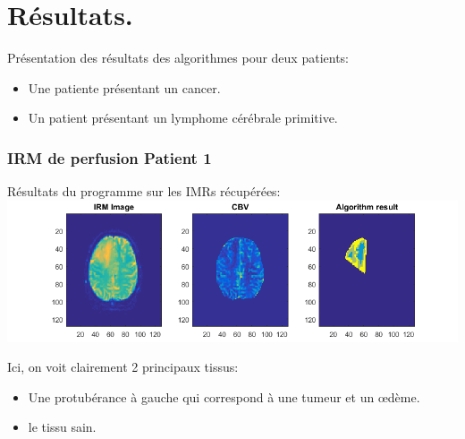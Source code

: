 \documentclass{beamer}
\begin{document}


\section{Résultats.}

\begin{frame}

Présentation des résultats des algorithmes pour deux patients:

\begin{itemize}
\item Une patiente présentant un cancer.
\item Un patient présentant un lymphome cérébrale primitive.
\end{itemize}



\end{frame}

\begin{frame}
\frametitle{IRM de perfusion Patient 1}


\end{frame}

\begin{frame}

Résultats du programme sur les IMRs récupérées:
\includegraphics[scale=0.40]{Patient2Result.png}

Ici, on voit clairement 2 principaux tissus:
\begin{itemize}
\item Une protubérance à gauche qui correspond à une tumeur et un œdème.
\item le tissu sain.
\end{itemize}
\end{frame}
\end{document}
